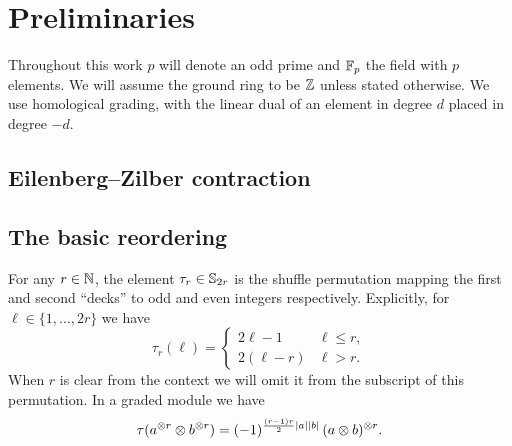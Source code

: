 
\section{Preliminaries}

Throughout this work $p$ will denote an odd prime and ${\mathbb{F}_p}$ the field with $p$ elements.
We will assume the ground ring to be $\mathbb{Z}$ unless stated otherwise.
We use homological grading, with the linear dual of an element in degree $d$ placed in degree $-d$.

\subsection{Eilenberg--Zilber contraction}

\TBW

\subsection{The basic reordering}\label{ss:reordering}

For any $r\in\mathbb{N}$, the element $\tau_r \in \mathbb{S}_{2r}$ is the shuffle permutation mapping the first and second ``decks'' to odd and even integers respectively.
Explicitly, for $\ell \in \{1,\dots,2r\}$ we have
\begin{equation*}
	\tau_r(\ell) =
	\begin{cases}
		2\ell-1 & \ell \leq r, \\
		2(\ell-r) & \ell > r.
	\end{cases}
\end{equation*}
When $r$ is clear from the context we will omit it from the subscript of this permutation.
In a graded module we have
\[
\tau(a^{\otimes r} \otimes b^{\otimes r}) =
(-1)^{\frac{(r-1)r}{2}\lvert a\rvert\lvert b\rvert} \, (a \otimes b)^{\otimes r}.
\]